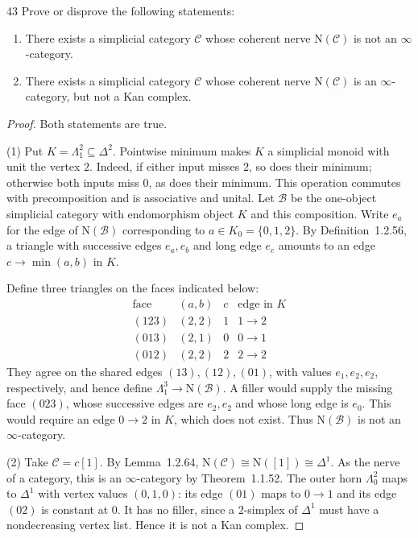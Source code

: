 \begin{exercise}{43}
Prove or disprove the following statements:
\begin{enumerate}[label=(\arabic*),leftmargin=*,itemsep=0pt,parsep=0pt,
                  topsep=.5\baselineskip]
 \item There exists a simplicial category $\mathcal C$ whose coherent nerve $\mathrm{N}(\mathcal C)$ is not an $\infty$-category.
 \item There exists a simplicial category $\mathcal C$ whose coherent nerve $\mathrm{N}(\mathcal C)$ is an $\infty$-category, but
 not a Kan complex.
\end{enumerate}

\begin{proof}
Both statements are true.

(1) Put $K=\Lambda^2_1\subseteq\Delta^2$.
Pointwise minimum makes $K$ a simplicial monoid with unit
the vertex $2$. Indeed, if either input misses $2$, so does
their minimum; otherwise both inputs miss $0$, as does their
minimum. This operation commutes with precomposition and
is associative and unital.
Let $\mathcal B$ be the one-object simplicial category with
endomorphism object $K$ and this composition.
Write $e_a$ for the edge of $\mathrm{N}(\mathcal B)$ corresponding
to $a\in K_0=\{0,1,2\}$.
By Definition~1.2.56, a triangle with successive edges
$e_a,e_b$ and long edge $e_c$ amounts to an edge
$c\to\min(a,b)$ in $K$.

Define three triangles on the faces indicated below:
\[
 \begin{array}{c|c|c|c}
  \text{face}&(a,b)&c&\text{edge in }K\\
  (123)&(2,2)&1&1\to2\\
  (013)&(2,1)&0&0\to1\\
  (012)&(2,2)&2&2\to2
 \end{array}
\]
They agree on the shared edges $(13),(12),(01)$, with
values $e_1,e_2,e_2$, respectively, and hence define
$\Lambda^3_1\to\mathrm{N}(\mathcal B)$.
A filler would supply the missing face $(023)$, whose
successive edges are $e_2,e_2$ and whose long edge is $e_0$.
This would require an edge $0\to2$ in $K$, which does not exist.
Thus $\mathrm{N}(\mathcal B)$ is not an $\infty$-category.

(2) Take $\mathcal C=c[1]$. By Lemma~1.2.64,
$\mathrm{N}(\mathcal C)\cong\mathrm{N}([1])\cong\Delta^1$.
As the nerve of a category, this is an $\infty$-category by
Theorem~1.1.52.
The outer horn $\Lambda^2_0$ maps to $\Delta^1$ with vertex
values $(0,1,0)$: its edge $(01)$ maps to $0\to1$ and
its edge $(02)$ is constant at $0$.
It has no filler, since a $2$-simplex of $\Delta^1$ must have
a nondecreasing vertex list. Hence it is not a Kan complex.
\end{proof}
\end{exercise}
